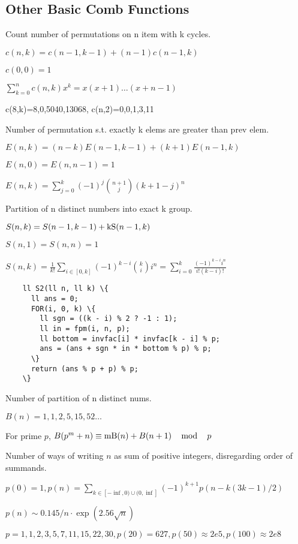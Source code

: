 \subsection{Other Basic Comb Functions}

Count number of permutations on n
item with k cycles.
\begin{tmindent}
  $c (n, k) = c (n - 1, k - 1) + (n - 1) c (n - 1, k)$
  
  $c (0, 0) = 1$
  
  $\sum_{k = 0}^n c (n, k) x^k = x (x + 1) \ldots (x + n - 1)$
  
  c(8,k)=8,0,5040,13068, c(n,2)=0,0,1,3,11
\end{tmindent}
Number of permutation s.t. exactly k elems are
greater than prev elem.
\begin{tmindent}
  $E (n, k) = (n - k) E (n - 1, k - 1) + (k + 1) E (n - 1, k)$
  
  $E (n, 0) = E (n, n - 1) = 1$
  
  $E (n, k) = \sum_{j = 0}^k (- 1)^j \binom{n + 1}{j} (k + 1 - j)^n$
\end{tmindent}
Partition of n distinct numbers
into exact k group.
\begin{tmindent}
  $S (n, k) = S (n - 1, k - 1) + \operatorname{kS} (n - 1, k)$
  
  $S (n, 1) = S (n, n) = 1$
  
  $S (n, k) = \frac{1}{k!} \sum_{i \in [0, k]} (- 1)^{k - i} \binom{k}{i} i^n
  = \sum_{i = 0}^k \frac{(- 1)^{k - i} i^n}{i! (k - i) !}$
  \begin{verbatim}
    ll S2(ll n, ll k) \{
      ll ans = 0;
      FOR(i, 0, k) \{
        ll sgn = ((k - i) % 2 ? -1 : 1);
        ll in = fpm(i, n, p);
        ll bottom = invfac[i] * invfac[k - i] % p;
        ans = (ans + sgn * in * bottom % p) % p;
      \}
      return (ans % p + p) % p;
    \}
  \end{verbatim}
  
\end{tmindent}
Number of partition of n distinct nums.
\begin{tmindent}
  $B (n) = 1, 1, 2, 5, 15, 52 \ldots$
  
  For prime $p$, $B (p^m + n) \equiv \operatorname{mB} (n) + B (n + 1) \quad
  \operatorname{mod} \quad p$
\end{tmindent}
Number of ways of writing $n$ as sum of
positive integers, disregarding order of summands.
\begin{tmindent}
  $p (0) = 1, p (n) = \sum_{k \in [- \inf, 0) \cup (0, \inf]} (- 1)^{k + 1} p
  (n - k (3 k - 1) / 2)$
  
  $p (n) \sim 0.145 / n \cdot \exp \left( 2.56 \sqrt{n} \right)$
  
  $p = 1, 1, 2, 3, 5, 7, 11, 15, 22, 30, p (20) = 627, p (50) \approx 2 e 5, p
  (100) \approx 2 e 8$
\end{tmindent}

